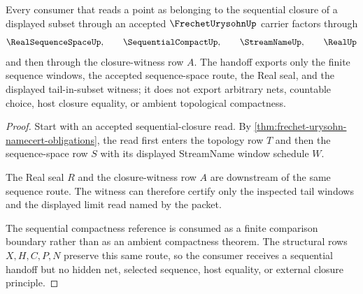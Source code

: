 \begin{theorem}
\label{thm:frechet-urysohn-sequential-closure-handoff}
Every consumer that reads a point as belonging to the sequential closure of a displayed subset through an accepted $\FrechetUrysohnUp$ carrier factors through
$$
\RealSequenceSpaceUp,\qquad
\SequentialCompactUp,\qquad
\StreamNameUp,\qquad
\RealUp
$$
and then through the closure-witness row $A$. The handoff exports only the finite sequence windows, the accepted sequence-space route, the Real seal, and the displayed tail-in-subset witness; it does not export arbitrary nets, countable choice, host closure equality, or ambient topological compactness.
\end{theorem}
\begin{proof}
Start with an accepted sequential-closure read. By \autoref{thm:frechet-urysohn-namecert-obligations}, the read first enters the topology row $T$ and then the sequence-space row $S$ with its displayed StreamName window schedule $W$.

The Real seal $R$ and the closure-witness row $A$ are downstream of the same sequence route. The witness can therefore certify only the inspected tail windows and the displayed limit read named by the packet.

The sequential compactness reference is consumed as a finite comparison boundary rather than as an ambient compactness theorem. The structural rows $X,H,C,P,N$ preserve this same route, so the consumer receives a sequential handoff but no hidden net, selected sequence, host equality, or external closure principle.
\end{proof}


\begin{closurestatus}{\FrechetUrysohnUp}
  \theoryclosure{\seedClosure}
  \formalstatus{\theoremCheckedV}
\end{closurestatus}
